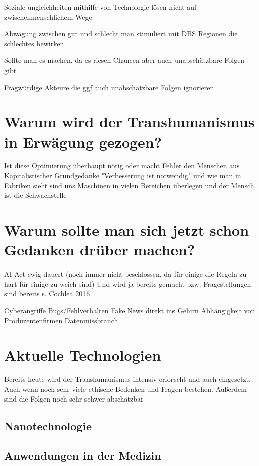 \documentclass[a4paper,
DIV=13,
12pt,
BCOR=10mm,
department=FakEI,
twoside,
parskip=half,
automark,
]{OTHRartcl}
\begin{document}
Soziale ungleichheiten mithilfe von Technologie lösen nicht auf zwischenmenschlichem Wege 



Abwägung zwischen gut und schlecht man stimuliert mit DBS Regionen die schlechtes bewirken

Sollte man es machen, da es riesen Chancen aber auch unabschätzbare Folgen gibt

Fragwürdige Akteure die ggf auch unabschätzbare Folgen ignorieren


\section*{Warum wird der Transhumanismus in Erwägung gezogen?}
Ist diese Optimierung überhaupt nötig oder macht Fehler den Menschen aus
Kapitalistischer Grundgedanke "Verbesserung ist notwendig" und wie man in Fabriken sieht sind uns Maschinen in vielen Bereichen überlegen und der Mensch ist die Schwachstelle

\section*{Warum sollte man sich jetzt schon Gedanken drüber machen?}
AI Act ewig dauert (noch immer nicht beschlossen, da für einige die Regeln zu hart für einige zu weich sind)
Und wird ja bereits gemacht bzw. Fragestellungen sind bereits s. Cochlea 2016


Cyberangriffe
Bugs/Fehlverhalten
Fake News direkt ins Gehirn
Abhängigkeit von Produzentenfirmen
Datenmissbrauch




\section*{Aktuelle Technologien}
Bereits heute wird der Transhumanismus intensiv erforscht und auch eingesetzt. Auch wenn noch sehr viele ethische Bedenken und Fragen bestehen. Außerdem sind die Folgen noch sehr schwer abschätzbar
\subsection*{Nanotechnologie}

\subsection*{Anwendungen in der Medizin}
\end{document}
